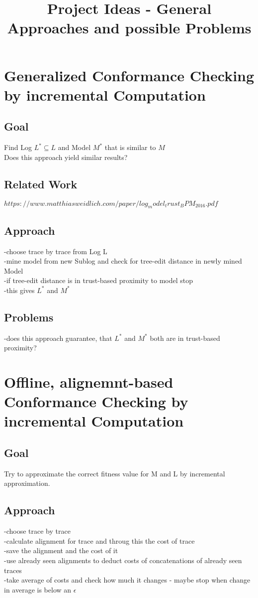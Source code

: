 \documentclass[]{article}
\title{Project Ideas - General Approaches and possible Problems}
\author{}
\begin{document}
\maketitle

\section{Generalized Conformance Checking by incremental Computation}
\subsection{Goal}
Find Log $L^* \subseteq L$ and Model $M^*$ that is similar to $M$\\
Does this approach yield similar results?


\subsection{Related Work}
$https://www.matthiasweidlich.com/paper/log_model_trust_BPM_2016.pdf$
\subsection{Approach}
-choose trace by trace from Log L\\
-mine model from new Sublog and check for tree-edit distance in newly mined Model\\
-if tree-edit distance is in trust-based proximity to model stop\\
-this gives $L^*$ and $M^*$\\

\subsection{Problems}
-does this approach guarantee, that $L^*$ and $M^*$ both are in trust-based proximity?
\newpage
\section{Offline, alignemnt-based Conformance Checking by incremental Computation}
\subsection{Goal}
Try to approximate the correct fitness value for M and L by incremental approximation.

\subsection{Approach}
-choose trace by trace\\
-calculate alignment for trace and throug this the cost of trace\\
-save the alignment and the cost of it\\
-use already seen alignments to deduct costs of concatenations of already seen traces\\
-take average of costs and check how much it changes - maybe stop when change in average is below an $\epsilon$
\end{document}
